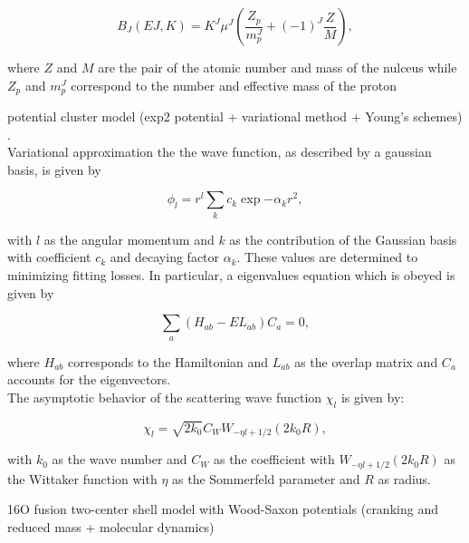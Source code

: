 \documentclass[openany]{book}
\begin{document}
\begin{equation}\label{eq:potential_radiativeCrossSections_Bj}
	B_J(EJ, K) = K^J \mu^J \left( \frac{Z_p}{m^J_p} + (-1)^{J} \frac{Z}{M}\right),
\end{equation}

where $Z$ and $M$ are the pair of the atomic number and mass of the nulceus while $Z_p$ and $m^J_p$ correspond to the number and effective mass of the proton



potential cluster model (exp2 potential + variational method + Young's schemes)
\cite{dubovichenko_2012}. \\

Variational approximation the the wave function, as described by a gaussian basis, is given by

\begin{equation}\label{eq:potential_variational_basis}
	\phi_l = r^l \sum_{k}  c_k \exp{-\alpha_k r^2},
 \end{equation}

with $l$ as the angular momentum and $k$ as the contribution of the Gaussian basis with coefficient $c_k$ and decaying factor $\alpha_k$. These values are determined to minimizing fitting losses. In particular, a eigenvalues equation which is obeyed is given by


\begin{equation}\label{eq:potential_variational_eigenvalues}
	\sum_{a} (H_{ab} - E L_{ab})C_a = 0,
\end{equation}

where $H_{ab}$ corresponds to the Hamiltonian and $L_{ab}$ as the overlap matrix and $C_a$ accounts for the eigenvectors.  \\

The asymptotic behavior of the scattering wave function $\chi_l$ is given by:


\begin{equation}\label{eq:potential_variational_scattering}
	\chi_l = \sqrt{2k_0} C_W W_{-\eta l + 1/2}(2k_0R),
\end{equation}

with $k_0$ as the wave number and $C_W$ as the coefficient with $ W_{-\eta l + 1/2}(2k_0R)$ as the Wittaker function with $\eta$ as the Sommerfeld parameter and $R$ as radius. 


16O fusion two-center shell model with Wood-Saxon potentials (cranking and reduced mass + molecular dynamics) \cite{diaz-torres_gasques_wiescher_2007} \\
\end{document}
